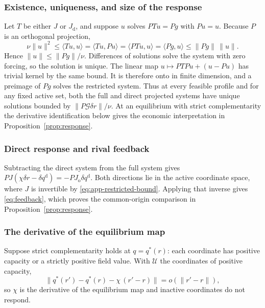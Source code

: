 \subsubsection{Existence, uniqueness, and size of the response}

Let $T$ be either $J$ or $J_{\mathrm d}$, and suppose $u$ solves
$PTu=Pg$ with $Pu=u$.
Because $P$ is an orthogonal projection,
\begin{equation}\label{eq:app-restricted-bound}
  \nu\|u\|^2\leq\langle Tu,u\rangle=\langle Tu,Pu\rangle
  =\langle PTu,u\rangle=\langle Pg,u\rangle\leq\|Pg\|\,\|u\|.
\end{equation}
Hence $\|u\|\leq\|Pg\|/\nu$.
Differences of solutions solve the system with zero forcing, so the
solution is unique.
The linear map $u\mapsto PTPu+(u-Pu)$ has trivial kernel by the same bound.
It is therefore onto in finite dimension, and a preimage of $Pg$ solves the
restricted system.
Thus at every feasible profile and for any fixed active set, both the full
and direct projected systems have unique solutions bounded by
$\|P\mathcal G\delta r\|/\nu$.
At an equilibrium with strict complementarity the derivative identification
below gives the economic interpretation in Proposition~\ref{prop:response}.

\subsubsection{Direct response and rival feedback}

Subtracting the direct system from the full system gives
$PJ(\chi\delta r-\delta q^{\mathrm d})=-PJ_{\mathrm o}\delta q^{\mathrm d}$.
Both directions lie in the active coordinate space, where $J$ is invertible
by \eqref{eq:app-restricted-bound}.
Applying that inverse gives \eqref{eq:feedback}, which proves the
common-origin comparison in Proposition~\ref{prop:response}.

\subsubsection{The derivative of the equilibrium
map}\label{app:equilibrium-derivative}

Suppose strict complementarity holds at $q=q^*(r)$: each coordinate has positive
capacity or a strictly positive field value.
With $\mathcal U$ the coordinates of positive capacity,
\begin{equation}\label{eq:equilibrium-derivative}
  \|q^*(r')-q^*(r)-\chi\,(r'-r)\|=o(\|r'-r\|),
\end{equation}
so $\chi$ is the derivative of the equilibrium map and inactive
coordinates do not
respond.

